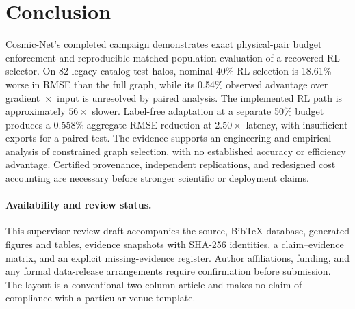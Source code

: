 \section{Conclusion}
Cosmic-Net's completed campaign demonstrates exact physical-pair budget enforcement and reproducible matched-population evaluation of a recovered RL selector. On 82 legacy-catalog test halos, nominal 40\% RL selection is 18.61\% worse in RMSE than the full graph, while its 0.54\% observed advantage over gradient~$\times$~input is unresolved by paired analysis. The implemented RL path is approximately $56\times$ slower. Label-free adaptation at a separate 50\% budget produces a 0.558\% aggregate RMSE reduction at $2.50\times$ latency, with insufficient exports for a paired test. The evidence supports an engineering and empirical analysis of constrained graph selection, with no established accuracy or efficiency advantage. Certified provenance, independent replications, and redesigned cost accounting are necessary before stronger scientific or deployment claims.

\paragraph{Availability and review status.}
This supervisor-review draft accompanies the source, BibTeX database, generated figures and tables, evidence snapshots with SHA-256 identities, a claim--evidence matrix, and an explicit missing-evidence register. Author affiliations, funding, and any formal data-release arrangements require confirmation before submission. The layout is a conventional two-column article and makes no claim of compliance with a particular venue template.
